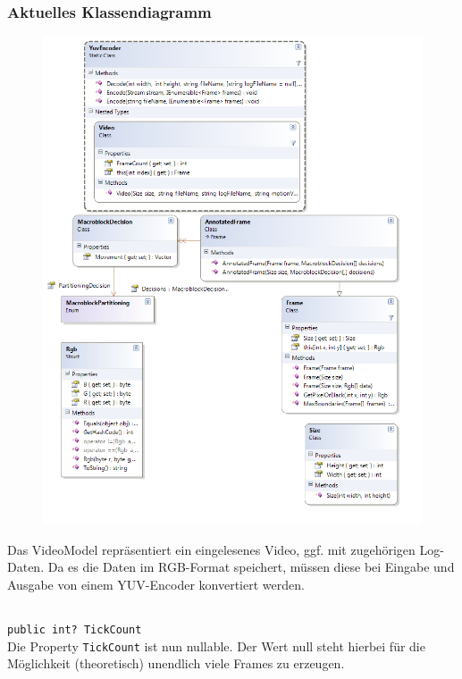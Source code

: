 \subsubsection*{Aktuelles Klassendiagramm}
\begin{figure}[h!]
\begin{center}
\includegraphics[height=0.7\textheight]{classdiagram/videomodel.png}
\end{center}
\end{figure}
Das VideoModel repräsentiert ein eingelesenes Video, ggf. mit zugehörigen Log-Daten. Da es die Daten im RGB-Format speichert, müssen diese bei Eingabe und Ausgabe von einem YUV-Encoder konvertiert werden.
\newpage

\subsection{}

\paragraph{}
\begin{itemize}
	\change \verb!public int? TickCount! \\
	Die Property \verb!TickCount! ist nun nullable. Der Wert null steht hierbei für die Möglichkeit (theoretisch) unendlich viele Frames zu erzeugen.
\end{itemize}


